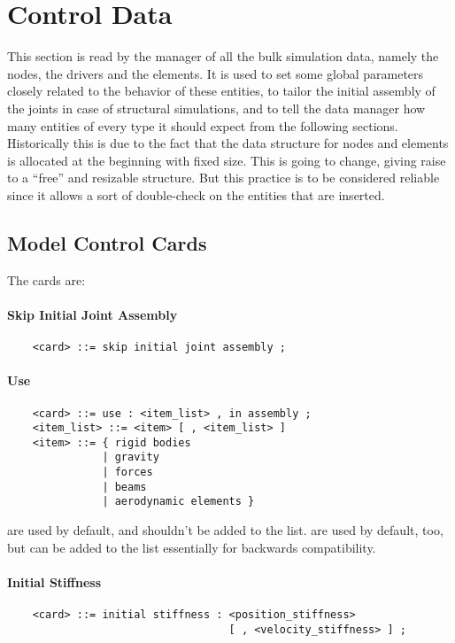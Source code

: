 \chapter{Control Data}
This section is read by the manager of all the bulk simulation data, namely
the nodes, the drivers and the elements. It is used to set some global
parameters closely related to the behavior of these entities, to tailor the
initial assembly of the joints in case of structural simulations, and to
tell the data manager how many entities of every type it should expect from
the following sections. Historically this is due to the fact that the data
structure for nodes and elements is allocated at the beginning with fixed
size. This is going to change, giving raise to a ``free'' and resizable
structure. But this practice is to be considered reliable since it allows a
sort of double-check on the entities that are inserted.

\section{Model Control Cards}
The cards are: 

\subsubsection{Skip Initial Joint Assembly}
\begin{verbatim}
    <card> ::= skip initial joint assembly ;
\end{verbatim}

\subsubsection{Use}
\begin{verbatim}
    <card> ::= use : <item_list> , in assembly ;
    <item_list> ::= <item> [ , <item_list> ]
    <item> ::= { rigid bodies 
               | gravity
               | forces
               | beams
               | aerodynamic elements } 
\end{verbatim}
 are used by default, and shouldn't be added to the list.
 are used by default, too, but can be added to the list
essentially for backwards compatibility.

\subsubsection{Initial Stiffness}
\begin{verbatim}
    <card> ::= initial stiffness : <position_stiffness>
                                   [ , <velocity_stiffness> ] ;
\end{verbatim}

